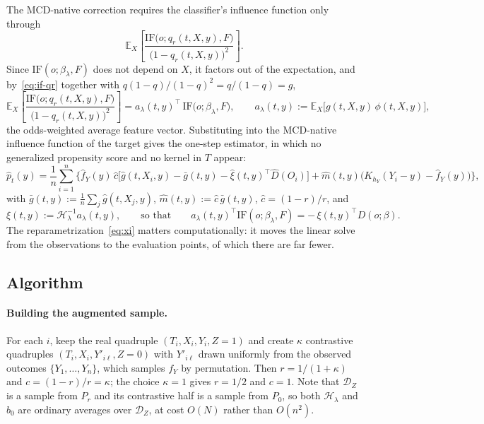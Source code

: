\documentclass[11pt]{article}
\newcommand{\Eb}{\mathbb{E}}
\newcommand{\IF}{\mathrm{IF}}
\newcommand{\Hb}{\mathcal{H}}
\newcommand{\Dz}{\mathcal{D}_Z}
\begin{document}
The MCD-native correction requires the classifier's influence function only through
\[
\Eb_X\!\left[\frac{\IF\big(o;q_r(t,X,y),F\big)}{\big(1-q_r(t,X,y)\big)^2}\right].
\]
Since $\IF(o;\beta_\lambda,F)$ does not depend on $X$, it factors out of the
expectation, and by~\eqref{eq:if-qr} together with
$q(1-q)/(1-q)^2=q/(1-q)=g$,
\begin{equation}
\Eb_X\!\left[\frac{\IF\big(o;q_r(t,X,y),F\big)}{\big(1-q_r(t,X,y)\big)^2}\right]
= a_\lambda(t,y)^\top\,\IF\big(o;\beta_\lambda,F\big),
\qquad
a_\lambda(t,y) := \Eb_X\big[g(t,X,y)\,\phi(t,X,y)\big],
\label{eq:a-lambda}
\end{equation}
the odds-weighted average feature vector. Substituting into the MCD-native influence
function of the target gives the one-step estimator, in which no generalized
propensity score and no kernel in $T$ appear:
\begin{equation}
\hat p_t(y)
= \frac1n\sum_{i=1}^n\Big\{
\hat f_Y(y)\,\hat c\Big[\hat g(t,X_i,y)-\bar g(t,y)-\hat\xi(t,y)^\top\widehat D(O_i)\Big]
+ \hat m(t,y)\big(K_{h_Y}(Y_i-y)-\hat f_Y(y)\big)\Big\},
\label{eq:final-estimator}
\end{equation}
with $\bar g(t,y):=\frac1n\sum_j\hat g(t,X_j,y)$, $\hat m(t,y):=\hat c\,\bar g(t,y)$,
$\hat c=(1-r)/r$, and
\begin{equation}
\xi(t,y) := \Hb_\lambda^{-1}a_\lambda(t,y),
\qquad\text{so that}\qquad
a_\lambda(t,y)^\top\IF(o;\beta_\lambda,F) = -\,\xi(t,y)^\top D(o;\beta).
\label{eq:xi}
\end{equation}
The reparametrization~\eqref{eq:xi} matters computationally: it moves the linear solve
from the observations to the evaluation points, of which there are far fewer.

\subsection{Algorithm}
\label{sec:algo}

\paragraph{Building the augmented sample.}
For each $i$, keep the real quadruple $(T_i,X_i,Y_i,Z{=}1)$ and create $\kappa$
contrastive quadruples $(T_i,X_i,Y'_{i\ell},Z{=}0)$ with $Y'_{i\ell}$ drawn uniformly
from the observed outcomes $\{Y_1,\dots,Y_n\}$, which samples $f_Y$ by permutation.
Then $r=1/(1+\kappa)$ and $c=(1-r)/r=\kappa$; the choice $\kappa=1$ gives $r=1/2$ and
$c=1$. Note that $\Dz$ is a sample from $P_r$ and its contrastive half is a sample
from $P_0$, so both $\Hb_\lambda$ and $b_0$ are ordinary averages over $\Dz$, at cost
$O(N)$ rather than $O(n^2)$.
\end{document}
